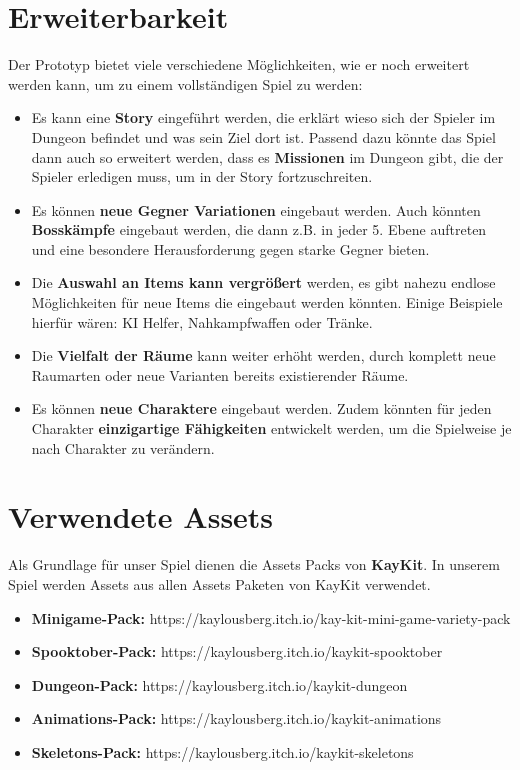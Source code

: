 \section{Erweiterbarkeit}
Der Prototyp bietet viele verschiedene Möglichkeiten, wie er noch erweitert werden kann, um zu einem vollständigen Spiel zu werden:
\begin{itemize}
\item Es kann eine \textbf{Story} eingeführt werden, die erklärt wieso sich der Spieler im Dungeon befindet und was sein Ziel dort ist. Passend dazu könnte das Spiel dann auch so erweitert werden, dass es \textbf{Missionen} im Dungeon gibt, die der Spieler erledigen muss, um in der Story fortzuschreiten.
\item Es können \textbf{neue Gegner Variationen} eingebaut werden. Auch könnten \textbf{Bosskämpfe} eingebaut werden, die dann z.B. in jeder 5. Ebene auftreten und eine besondere Herausforderung gegen starke Gegner bieten.
\item Die \textbf{Auswahl an Items kann vergrößert} werden, es gibt nahezu endlose Möglichkeiten für neue Items die eingebaut werden könnten. Einige Beispiele hierfür wären: KI Helfer, Nahkampfwaffen oder Tränke.
\item Die \textbf{Vielfalt der Räume} kann weiter erhöht werden, durch komplett neue Raumarten oder neue Varianten bereits existierender Räume.
\item Es können \textbf{neue Charaktere} eingebaut werden. Zudem könnten für jeden Charakter \textbf{einzigartige Fähigkeiten} entwickelt werden, um die Spielweise je nach Charakter zu verändern.
\end{itemize}

\section{Verwendete Assets}

Als Grundlage für unser Spiel dienen die Assets Packs von \textbf{KayKit}. In unserem Spiel werden Assets aus allen Assets Paketen von KayKit verwendet.
\begin{itemize}
\item \textbf{Minigame-Pack:} https://kaylousberg.itch.io/kay-kit-mini-game-variety-pack
\item \textbf{Spooktober-Pack:} https://kaylousberg.itch.io/kaykit-spooktober
\item \textbf{Dungeon-Pack:} https://kaylousberg.itch.io/kaykit-dungeon
\item \textbf{Animations-Pack:} https://kaylousberg.itch.io/kaykit-animations
\item \textbf{Skeletons-Pack:} https://kaylousberg.itch.io/kaykit-skeletons
\end{itemize}

